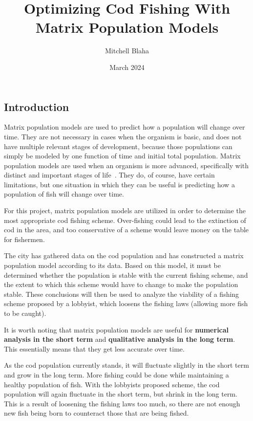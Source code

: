 \documentclass{article}
\title{Optimizing Cod Fishing With Matrix Population Models}
\author{Mitchell Blaha}
\date{March 2024}
\begin{document}
    \maketitle
    \tableofcontents

    \newpage
    \begin{center}
        \section{Introduction}\label{sec:introduction}
    \end{center}

    Matrix population models are used to predict how a population will change over time.
    They are not necessary in cases when the organism is basic, and does not have multiple relevant stages of development, because those populations can simply be modeled by one function of time and initial total population.
    Matrix population models are used when an organism is more advanced, specifically with distinct and important stages of life~\cite{shoemaker_lab_2024}.
    They do, of course, have certain limitations, but one situation in which they can be useful is predicting how a population of fish will change over time.

    For this project, matrix population models are utilized in order to determine the most appropriate cod fishing scheme.
    Over-fishing could lead to the extinction of cod in the area, and too conservative of a scheme would leave money on the table for fishermen.

    The city has gathered data on the cod population and has constructed a matrix population model according to its data.
    Based on this model, it must be determined whether the population is stable with the current fishing scheme, and the extent to which this scheme would have to change to make the population stable.
    These conclusions will then be used to analyze the viability of a fishing scheme proposed by a lobbyist, which loosens the fishing laws (allowing more fish to be caught).

    It is worth noting that matrix population models are useful for \textbf{numerical analysis in the short term} and \textbf{qualitative analysis in the long term}.
    This essentially means that they get less accurate over time.

    As the cod population currently stands, it will fluctuate slightly in the short term and grow in the long term.
    More fishing could be done while maintaining a healthy population of fish.
    With the lobbyists proposed scheme, the cod population will again fluctuate in the short term, but shrink in the long term.
    This is a result of loosening the fishing laws too much, so there are not enough new fish being born to counteract those that are being fished.
\end{document}
